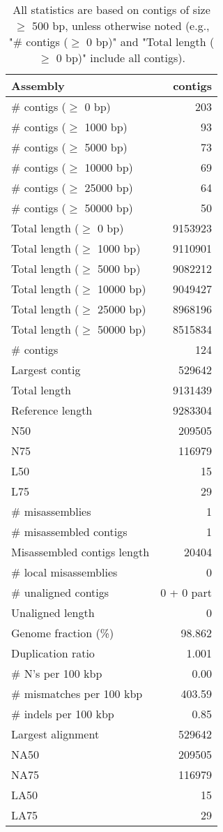 \documentclass[12pt,a4paper]{article}
\begin{document}
\begin{table}[ht]
\begin{center}
\caption{All statistics are based on contigs of size $\geq$ 500 bp, unless otherwise noted (e.g., "\# contigs ($\geq$ 0 bp)" and "Total length ($\geq$ 0 bp)" include all contigs).}
\begin{tabular}{|l*{1}{|r}|}
\hline
Assembly & contigs \\ \hline
\# contigs ($\geq$ 0 bp) & 203 \\ \hline
\# contigs ($\geq$ 1000 bp) & 93 \\ \hline
\# contigs ($\geq$ 5000 bp) & 73 \\ \hline
\# contigs ($\geq$ 10000 bp) & 69 \\ \hline
\# contigs ($\geq$ 25000 bp) & 64 \\ \hline
\# contigs ($\geq$ 50000 bp) & 50 \\ \hline
Total length ($\geq$ 0 bp) & 9153923 \\ \hline
Total length ($\geq$ 1000 bp) & 9110901 \\ \hline
Total length ($\geq$ 5000 bp) & 9082212 \\ \hline
Total length ($\geq$ 10000 bp) & 9049427 \\ \hline
Total length ($\geq$ 25000 bp) & 8968196 \\ \hline
Total length ($\geq$ 50000 bp) & 8515834 \\ \hline
\# contigs & 124 \\ \hline
Largest contig & 529642 \\ \hline
Total length & 9131439 \\ \hline
Reference length & 9283304 \\ \hline
N50 & 209505 \\ \hline
N75 & 116979 \\ \hline
L50 & 15 \\ \hline
L75 & 29 \\ \hline
\# misassemblies & 1 \\ \hline
\# misassembled contigs & 1 \\ \hline
Misassembled contigs length & 20404 \\ \hline
\# local misassemblies & 0 \\ \hline
\# unaligned contigs & 0 + 0 part \\ \hline
Unaligned length & 0 \\ \hline
Genome fraction (\%) & 98.862 \\ \hline
Duplication ratio & 1.001 \\ \hline
\# N's per 100 kbp & 0.00 \\ \hline
\# mismatches per 100 kbp & 403.59 \\ \hline
\# indels per 100 kbp & 0.85 \\ \hline
Largest alignment & 529642 \\ \hline
NA50 & 209505 \\ \hline
NA75 & 116979 \\ \hline
LA50 & 15 \\ \hline
LA75 & 29 \\ \hline
\end{tabular}
\end{center}
\end{table}
\end{document}
